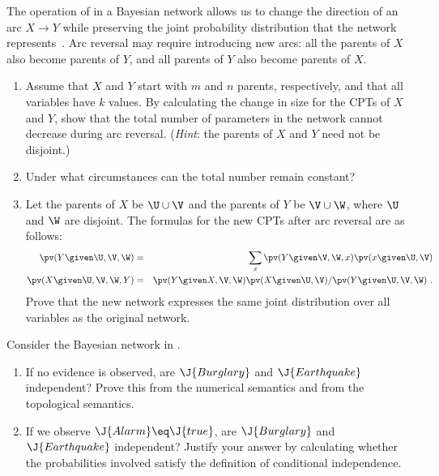 \begin{exercise}
The operation of  in a Bayesian network allows us to change the direction of an 
arc \(X\rightarrow Y\) while preserving the joint probability distribution that the network represents~\cite{Shachter:1986}.  Arc reversal
may require introducing new arcs:  all the parents of \(X\) also become 
parents of \(Y\), and all parents of \(Y\) also become parents of \(X\).
\begin{enumerate}
\item Assume that \(X\) and \(Y\) start with \(m\) and \(n\) parents, respectively,
and that all variables have \(k\) values. By calculating the change in size for the CPTs of \(X\) and \(Y\),
show that the total number of parameters in the network cannot decrease during arc reversal. ({\em Hint}: the parents of
\(X\) and \(Y\) need not be disjoint.)
\item Under what circumstances can the total number remain constant?
\item Let the parents of \(X\) be \(\U \cup \V\) and the parents of \(Y\) be \(\V \cup \W\), where \(\U\) and \(\W\) are disjoint.
The formulas for the new CPTs after arc reversal are as follows:
\begin{eqnarray*}
\pv(Y\given \U,\V,\W) &=& \sum_x \pv(Y\given \V,\W, x) \pv(x\given \U, \V) \\
\pv(X\given \U,\V,\W, Y) &=& \pv(Y\given X, \V, \W) \pv(X\given \U, \V) / \pv(Y\given \U,\V,\W)\ .
\end{eqnarray*}
Prove that the new network expresses the same joint distribution over all variables as the original network.
\end{enumerate}
\end{exercise} 

\begin{exercise}
Consider the Bayesian network in .
\begin{enumerate}
\item If no evidence is observed, are \(\J{Burglary}\) and \(\J{Earthquake}\) independent?
Prove this from the numerical semantics and from the topological semantics.
\item If we observe \(\J{Alarm}\eq \J{true}\), are \(\J{Burglary}\) and \(\J{Earthquake}\) independent?
Justify your answer by calculating whether the probabilities involved satisfy the definition of conditional independence.
\end{enumerate}
\end{exercise} 

